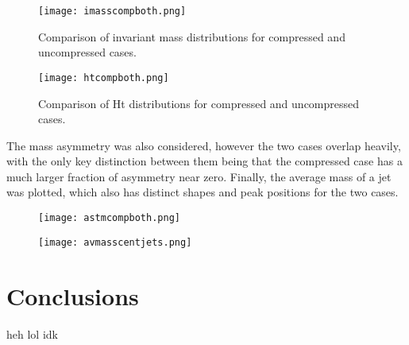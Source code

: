 \documentclass{article}
\begin{document}
\begin{figure}[H]
\centering
\texttt{[image: imasscompboth.png]}
\caption{Comparison of invariant mass distributions for compressed and uncompressed cases.}
	\label{c1}
\end{figure}

\begin{figure}[H]
\centering
\texttt{[image: htcompboth.png]}
\caption{Comparison of Ht distributions for compressed and uncompressed cases.}
	\label{c2}
\end{figure}

The mass asymmetry was also considered, however the two cases overlap heavily, with the only key distinction between them being that the compressed case has a much larger fraction of asymmetry near zero. Finally, the average mass of a jet was plotted, which also has distinct shapes and peak positions for the two cases. 

\begin{figure}[H]
\centering
\texttt{[image: astmcompboth.png]}
\end{figure}

\begin{figure}[H]
\centering
\texttt{[image: avmasscentjets.png]}
\end{figure}

\section*{Conclusions}
heh lol idk




\end{document}
